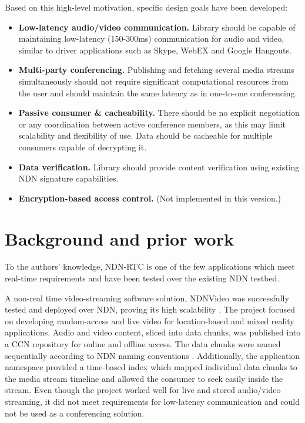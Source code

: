 \documentclass{icn/sig-alternate-2012} %
\newcommand{\ndnrtcName}{NDN-RTC} %
\begin{document}

Based on this high-level motivation, specific design goals have been developed: 

\begin{itemize}
\item \textbf{Low-latency audio/video communication.} Library should be capable of maintaining low-latency (150-300ms) communication for audio and video, similar to driver applications such as Skype, WebEX and Google Hangouts.

\item \textbf{Multi-party conferencing.} Publishing and fetching several media streams simultaneously should not require significant computational resources from the user and should maintain the same latency as in one-to-one conferencing.

\item \textbf{Passive consumer \& cacheability.} There should be no explicit negotiation or any coordination between active conference members, as this may limit scalability and flexibility of use. Data should be cacheable for multiple consumers capable of decrypting it. 

\item \textbf{Data verification.} Library should provide content verification using existing NDN signature capabilities. 

\item \textbf{Encryption-based access control.}   (Not implemented in this version.)
\end{itemize} 


\section{Background and prior work}
\label{sec:bg}
To the authors' knowledge, \ndnrtcName{} is one of the few applications which meet real-time requirements and have been tested over the existing NDN testbed.

A non-real time video-streaming software solution, NDNVideo was successfully tested and deployed over NDN, proving its high scalability \cite{ndnvideo}. The project focused on developing random-access and live video for location-based and mixed reality applications. Audio and video content, sliced into data chunks, was published into a CCN repository for online and offline access. The data chunks were named sequentially according to NDN naming conventions \cite{ndnnaming}. Additionally, the application namespace provided a time-based index which mapped individual data chunks to the media stream timeline and allowed the consumer to seek easily inside the stream. Even though the project worked well for live and stored audio/video streaming, it did not meet requirements for low-latency communication and could not be used as a conferencing solution.
\end{document}
